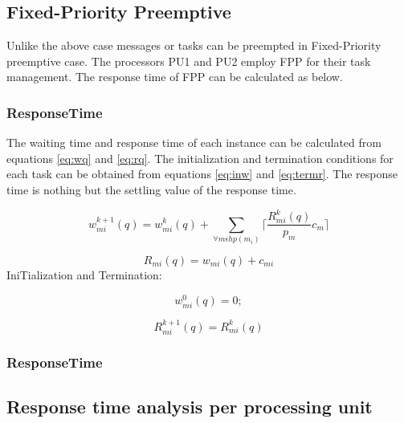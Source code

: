\subsection{Fixed-Priority Preemptive}
Unlike the above case messages or tasks can be preempted in Fixed-Priority preemptive case. The processors PU1 and PU2 employ FPP for their task management. The response time of FPP can be calculated as below.
\subsubsection{ResponseTime}
The waiting time and response time of each instance can be calculated from equations \ref{eq:wq} and \ref{eq:rq}. The initialization and termination conditions for each task can be obtained from equations \ref{eq:inw} and \ref{eq:termr}. The response time is nothing but the settling value of the response time.  


\begin{equation}
w_{mi}^{k+1}(q)=w_{mi}^{k}(q)+\sum_{\forall m\epsilon hp(m_i)}\lceil \frac{R_{mi}^k(q)}{p_{m}}c_m \rceil
\label{eq:wq}
\end{equation}

\begin{equation}
R_{mi}(q)=w_{mi}(q)+c_{mi}
\label{eq:rq}
\end{equation}
IniTialization and Termination:

\begin{equation}
w_{mi}^{0}(q)=0;
\label{eq:inw}
\end{equation}

\begin{equation}
R_{mi}^{k+1}(q)=R_{mi}^{k}(q)
\label{eq:termr}
\end{equation}




\subsubsection{ResponseTime}

\subsection{Response time analysis per processing unit}

